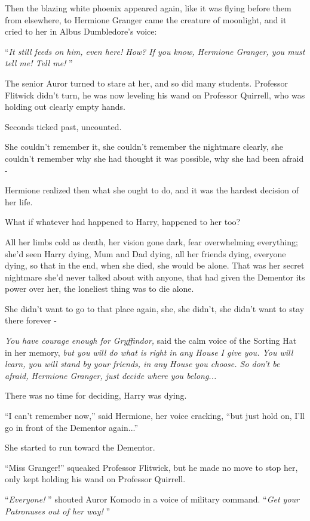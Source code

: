 Then the blazing white phoenix appeared again, like it was flying before
them from elsewhere, to Hermione Granger came the creature of moonlight,
and it cried to her in Albus Dumbledore's voice:

``\emph{It still feeds on him, even here! How? If you know, Hermione
Granger, you must tell me! Tell me!} ''

The senior Auror turned to stare at her, and so did many students.
Professor Flitwick didn't turn, he was now leveling his wand on
Professor Quirrell, who was holding out clearly empty hands.

Seconds ticked past, uncounted.

She couldn't remember it, she couldn't remember the nightmare clearly,
she couldn't remember why she had thought it was possible, why she had
been afraid -

Hermione realized then what she ought to do, and it was the hardest
decision of her life.

What if whatever had happened to Harry, happened to her too?

All her limbs cold as death, her vision gone dark, fear overwhelming
everything; she'd seen Harry dying, Mum and Dad dying, all her friends
dying, everyone dying, so that in the end, when she died, she would be
alone. That was her secret nightmare she'd never talked about with
anyone, that had given the Dementor its power over her, the loneliest
thing was to die alone.

She didn't want to go to that place again, she, she didn't, she didn't
want to stay there forever -

\emph{You have courage enough for Gryffindor,} said the calm voice of
the Sorting Hat in her memory, \emph{but you will do what is right in
any House I give you. You will learn, you will stand by your friends, in
any House you choose. So don't be afraid, Hermione Granger, just decide
where you belong...}

There was no time for deciding, Harry was dying.

``I can't remember now,'' said Hermione, her voice cracking, ``but just
hold on, I'll go in front of the Dementor again...''

She started to run toward the Dementor.

``Miss Granger!'' squeaked Professor Flitwick, but he made no move to
stop her, only kept holding his wand on Professor Quirrell.

``\emph{Everyone!} '' shouted Auror Komodo in a voice of military command.
``\emph{Get your Patronuses out of her way!} ''

